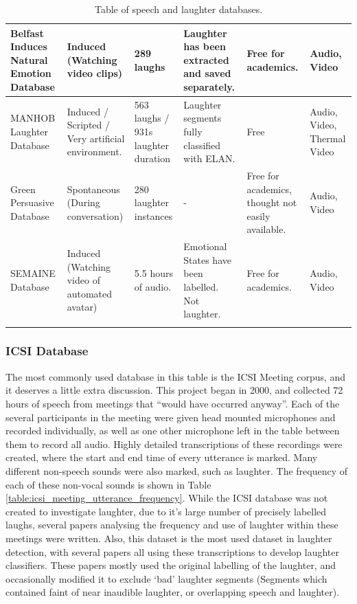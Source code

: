 \documentclass[a4paper,11pt,notitlepage]{article}
\begin{document}
\begin{landscape}
\begin{longtable}{|p{3cm}|p{4cm}|p{2cm}|p{3cm}|p{3.5cm}|p{3cm}|}
Belfast Induces Natural Emotion Database & Induced (Watching video clips) & 289 laughs & Laughter has been extracted and saved separately. & Free for academics. & Audio, Video \\ \hline

MANHOB Laughter Database & Induced / Scripted / Very artificial environment. & 563 laughs / 931s laughter duration & Laughter segments fully classified with ELAN. & Free & Audio, Video, Thermal Video \\ \hline

Green Persuasive Database & Spontaneous (During conversation) & 280 laughter instances & - & Free for academics, thought not easily available. & Audio, Video \\ \hline

SEMAINE Database & Induced (Watching video of automated avatar) & 5.5 hours of audio. & Emotional States have been labelled. Not laughter. & Free for academics. & Audio, Video \\ \hline

\caption{Table of speech and laughter databases.}
\label{table:table_of_databases}
\end{longtable}
\end{landscape}
\subsubsection{ICSI Database}
The most commonly used database in this table is the ICSI Meeting corpus, and it deserves a little extra discussion. This project began in 2000, and collected 72 hours of speech from meetings that ``would have occurred anyway''\cite{janin2003icsi}. Each of the several participants in the meeting were given head mounted microphones and recorded individually, as well as one other microphone left in the table between them to record all audio. Highly detailed transcriptions of these recordings were created, where the start and end time of every utterance is marked. Many different non-speech sounds were also marked, such as laughter. The frequency of each of these non-vocal sounds is shown in Table \ref{table:icsi_meeting_utterance_frequency}\cite{laskowski2007correlation}. While the ICSI database was not created to investigate laughter, due to it's large number of precisely labelled laughs, several papers analysing the frequency and use of laughter within these meetings were written. Also, this dataset is the most used dataset in laughter detection, with several papers all using these transcriptions to develop laughter classifiers.\cite{kennedy2004laughter,truong2005automatic,knox2007automatic} These papers mostly used the original labelling of the laughter, and occasionally modified it to exclude `bad' laughter segments (Segments which contained faint of near inaudible laughter, or overlapping speech and laughter)\cite{truong2005automatic}.
\end{document}
